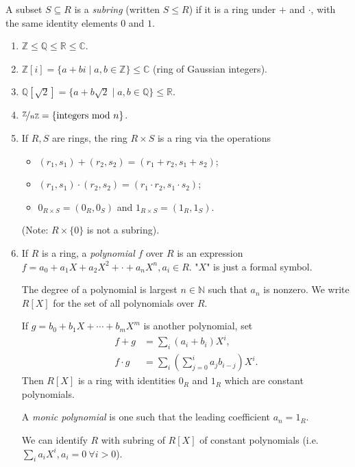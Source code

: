 \begin{definition}{}{}
    A subset \(S \subseteq R\) is a \textit{subring} (written \(S \leq R\)) if it is a ring under \(+\) and \(\cdot\), with the same identity elements \(0\) and \(1\).
\end{definition}
\begin{example}
    \leavevmode
    \begin{enumerate}
        \item \(\mathbb{Z} \leq \mathbb{Q}\leq \mathbb{R}\leq \mathbb{C}\).
        \item \(\mathbb{Z}[i] = \{a + bi\mid a,b \in \mathbb{Z}\}\leq \mathbb{C}\) (ring of Gaussian integers).
        \item \(\mathbb{Q}[\sqrt{2}] = \{a + b \sqrt{2} \mid a, b \in \mathbb{Q}\} \leq \mathbb{R}\).
        \item \(\nicefrac{\mathbb{Z}}{n\mathbb{Z}}=\{\text{integers mod }n\}\).
        \item If \(R, S\) are rings, the ring \(R \times S\) is a ring via the operations
        \begin{itemize}
            \item \((r_1,s_1) + (r_2, s_2) = (r_1 + r_2, s_1 + s_2)\);
            \item \((r_1,s_1)\cdot (r_2,s_2) = (r_1 \cdot r_2, s_1 \cdot s_2)\);
            \item \(0_{R\times S} = (0_R, 0_S)\) and \(1_{R\times S} = (1_R, 1_{S})\).
        \end{itemize}
        (Note: \(R \times \{0\}\) is not a subring).
        \item If \(R\) is a ring, a \textit{polynomial}  \(f\) over \(R\) is an expression \(f = a_0 + a_{1}X + a_2 X^2 + \cdot + a_n X^n, a_i \in R\). "\(X\)" is just a formal symbol.

        The degree of a polynomial is largest \(n \in \mathbb{N}\) such that \(a_n\) is nonzero. We write \(R[X]\) for the set of all polynomials over \(R\).

        If \(g = b_0 + b_1 X + \cdots + b_m X^m\) is another polynomial, set
        \begin{align*}
            f + g &= \sum\limits_{i}(a_i + b_i)X^i,\\
            f \cdot g &= \sum_i(\sum\limits_{j=0}^{i} a_{j}b_{i - j})X^i.
        \end{align*}
        Then \(R[X]\) is a ring with identities \(0_R\) and \(1_R\) which are constant polynomials.

        A \textit{monic polynomial}  is one such that the leading coefficient \(a_n = 1_R\).

        We can identify \(R\) with subring of \(R[X]\) of constant polynomials (i.e. \(\sum\limits_{i}^{} a_i X^i, a_i = 0~\forall i > 0\)).
    \end{enumerate}
\end{example}
